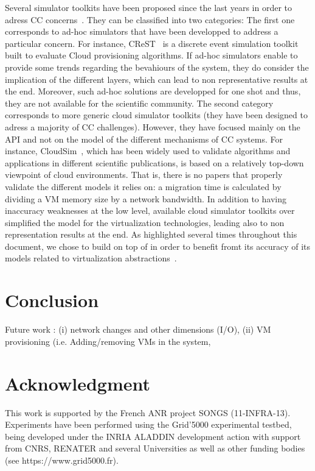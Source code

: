 Several simulator toolkits have been proposed since the last years in
order to adress CC concerns~\cite{CC13, DGSIM, cloudsim,
  icancloud, greencloud}.
They can be classified into two categories: The first one corresponds to ad-hoc simulators
that have been developped to address a particular concern. For
instance, CReST~\cite{CC13} is a discrete event simulation toolkit
built to evaluate Cloud provisioning algorithms. If ad-hoc simulators
enable to provide some trends regarding the bevahiours of the system,
they do consider the implication of the different layers, which can
lead to non representative results at the end. Moreover, such ad-hoc
solutions are developped for one shot and thus, they are not available
for the scientific community. The second category
\cite{icancloud, greencloud, cloudsim} corresponds to more generic cloud simulator
toolkits (\ie they have been designed to adress a majority
of CC challenges). However, they have focused mainly on
the API and not on the model of the different mechanisms of CC
systems.
For instance, CloudSim~\cite{cloudsim}, which has been widely used to validate
algorithms and applications in different scientific publications,
is based on a relatively top-down viewpoint of cloud environments.
That is,  there is no papers that properly validate the different models it
relies on: a migration time is calculated by dividing a VM memory size by a
network bandwidth.
 In addition to having inaccuracy weaknesses at the low level, available cloud
simulator toolkits over simplified the model for the virtualization
technologies, leading also to non representation results at the
end. As highlighted several times throughout this document, we chose to
build \vmps on top of \sg in order to benefit fromt its accuracy of
its models related to virtualization abstractions~\cite{Hirofuchi:2013:ALM:2568486.2568524}.

\section{Conclusion}
\label{sec:conclusion}
Future work : (i) network changes and other dimensions (I/O), (ii) VM provisioning (i.e.
Adding/removing VMs in the system,




\section{Acknowledgment}
This work is supported by the French ANR project SONGS (11-INFRA-13).
Experiments have been performed using the Grid'5000
experimental testbed, being developed under the INRIA ALADDIN development
 action with support from CNRS, RENATER and several Universities as well as
 other funding bodies (see https://www.grid5000.fr).


